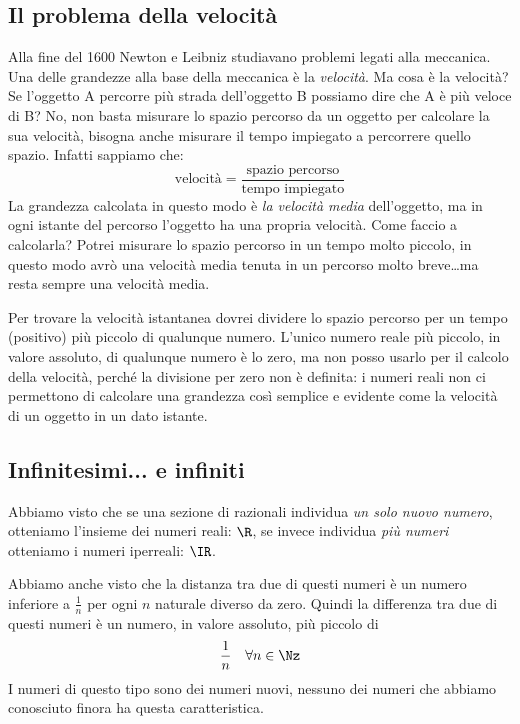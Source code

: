 \subsection{Il problema della velocità}
\label{subsec:insnum_velocita}

Alla fine del 1600 Newton e Leibniz studiavano problemi legati alla 
meccanica. 
Una delle grandezze alla base della meccanica è la \emph{velocità}. 
Ma cosa è la velocità? 
Se l'oggetto A percorre più strada dell'oggetto B possiamo dire 
che A è più veloce di B? No, non basta misurare lo spazio percorso da un 
oggetto per calcolare la sua velocità, bisogna anche misurare il tempo 
impiegato a percorrere quello spazio. Infatti sappiamo che:
\[\text{velocità} = 
  \frac{\text{spazio percorso}}{\text{tempo impiegato}}\]
La grandezza calcolata in questo modo è \emph{la velocità media} 
dell'oggetto, ma in ogni istante del percorso l'oggetto ha una propria 
velocità. 
Come faccio a calcolarla? Potrei misurare lo spazio percorso in un tempo 
molto piccolo, in questo modo avrò una velocità media tenuta in un percorso 
molto breve\dots ma resta sempre una velocità media. 

Per trovare la velocità istantanea dovrei dividere lo spazio percorso per 
un tempo (positivo) più piccolo di qualunque numero. L'unico numero reale
più piccolo, in valore assoluto, di qualunque numero è lo zero, ma 
non posso usarlo per il calcolo della velocità, perché la divisione per 
zero non è definita: i numeri reali non ci permettono di calcolare una 
grandezza così semplice e evidente come la velocità di un oggetto in un 
dato istante.


\subsection{Infinitesimi... e infiniti}
\label{subsec:insnum_nonarchimedei}

Abbiamo visto che se una sezione di razionali individua 
\emph{un solo nuovo numero}, 
otteniamo l'insieme dei numeri reali: \(\R\), se invece individua 
\emph{più numeri} otteniamo i numeri iperreali: \(\IR\).

Abbiamo anche visto che la distanza tra due di questi numeri è un numero 
inferiore a \(\frac{1}{n}\) per ogni \(n\) naturale diverso da zero.
Quindi la differenza tra due di questi numeri è un  numero, in valore 
assoluto, più piccolo di 
\[\frac{1}{n} \quad \forall n \in \Nz\]
I numeri di questo tipo sono dei numeri nuovi, nessuno dei numeri che 
abbiamo conosciuto finora ha questa caratteristica.

